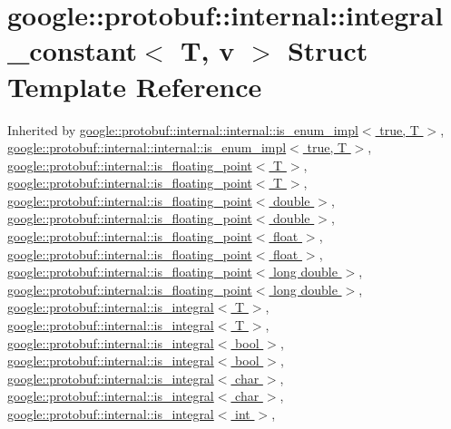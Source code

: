 \hypertarget{structgoogle_1_1protobuf_1_1internal_1_1integral__constant}{}\section{google\+:\+:protobuf\+:\+:internal\+:\+:integral\+\_\+constant$<$ T, v $>$ Struct Template Reference}
\label{structgoogle_1_1protobuf_1_1internal_1_1integral__constant}


Inherited by \hyperlink{structgoogle_1_1protobuf_1_1internal_1_1internal_1_1is__enum__impl_3_01true_00_01T_01_4}{google\+::protobuf\+::internal\+::internal\+::is\+\_\+enum\+\_\+impl$<$ true, T $>$}, \hyperlink{structgoogle_1_1protobuf_1_1internal_1_1internal_1_1is__enum__impl_3_01true_00_01T_01_4}{google\+::protobuf\+::internal\+::internal\+::is\+\_\+enum\+\_\+impl$<$ true, T $>$}, \hyperlink{structgoogle_1_1protobuf_1_1internal_1_1is__floating__point}{google\+::protobuf\+::internal\+::is\+\_\+floating\+\_\+point$<$ T $>$}, \hyperlink{structgoogle_1_1protobuf_1_1internal_1_1is__floating__point}{google\+::protobuf\+::internal\+::is\+\_\+floating\+\_\+point$<$ T $>$}, \hyperlink{structgoogle_1_1protobuf_1_1internal_1_1is__floating__point_3_01double_01_4}{google\+::protobuf\+::internal\+::is\+\_\+floating\+\_\+point$<$ double $>$}, \hyperlink{structgoogle_1_1protobuf_1_1internal_1_1is__floating__point_3_01double_01_4}{google\+::protobuf\+::internal\+::is\+\_\+floating\+\_\+point$<$ double $>$}, \hyperlink{structgoogle_1_1protobuf_1_1internal_1_1is__floating__point_3_01float_01_4}{google\+::protobuf\+::internal\+::is\+\_\+floating\+\_\+point$<$ float $>$}, \hyperlink{structgoogle_1_1protobuf_1_1internal_1_1is__floating__point_3_01float_01_4}{google\+::protobuf\+::internal\+::is\+\_\+floating\+\_\+point$<$ float $>$}, \hyperlink{structgoogle_1_1protobuf_1_1internal_1_1is__floating__point_3_01long_01double_01_4}{google\+::protobuf\+::internal\+::is\+\_\+floating\+\_\+point$<$ long double $>$}, \hyperlink{structgoogle_1_1protobuf_1_1internal_1_1is__floating__point_3_01long_01double_01_4}{google\+::protobuf\+::internal\+::is\+\_\+floating\+\_\+point$<$ long double $>$}, \hyperlink{structgoogle_1_1protobuf_1_1internal_1_1is__integral}{google\+::protobuf\+::internal\+::is\+\_\+integral$<$ T $>$}, \hyperlink{structgoogle_1_1protobuf_1_1internal_1_1is__integral}{google\+::protobuf\+::internal\+::is\+\_\+integral$<$ T $>$}, \hyperlink{structgoogle_1_1protobuf_1_1internal_1_1is__integral_3_01bool_01_4}{google\+::protobuf\+::internal\+::is\+\_\+integral$<$ bool $>$}, \hyperlink{structgoogle_1_1protobuf_1_1internal_1_1is__integral_3_01bool_01_4}{google\+::protobuf\+::internal\+::is\+\_\+integral$<$ bool $>$}, \hyperlink{structgoogle_1_1protobuf_1_1internal_1_1is__integral_3_01char_01_4}{google\+::protobuf\+::internal\+::is\+\_\+integral$<$ char $>$}, \hyperlink{structgoogle_1_1protobuf_1_1internal_1_1is__integral_3_01char_01_4}{google\+::protobuf\+::internal\+::is\+\_\+integral$<$ char $>$}, \hyperlink{structgoogle_1_1protobuf_1_1internal_1_1is__integral_3_01int_01_4}{google\+::protobuf\+::internal\+::is\+\_\+integral$<$ int $>$}, 